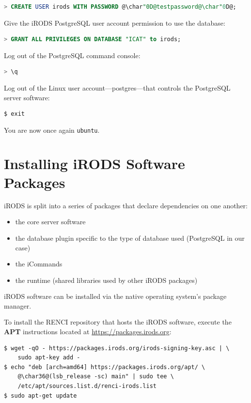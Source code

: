 \documentclass[10pt,oneside]{memoir}
\begin{document}
\begin{lstlisting}[language=sql]
  > CREATE USER irods WITH PASSWORD @\char"0D@testpassword@\char"0D@;
\end{lstlisting}

Give the iRODS PostgreSQL user account permission to use the database:

\begin{lstlisting}[language=sql]
> GRANT ALL PRIVILEGES ON DATABASE "ICAT" to irods;
\end{lstlisting}

Log out of the PostgreSQL command console:

\begin{lstlisting}[language=sql]
> \q
\end{lstlisting}

Log out of the Linux user account---postgres---that controls the PostgreSQL server software:

\begin{lstlisting}
$ exit
\end{lstlisting}

You are now once again \texttt{ubuntu}.

\section{Installing iRODS Software Packages}
iRODS is split into a series of packages that declare dependencies on one another:
\begin{itemize}
 \item the core server software
 \item the database plugin specific to the type of database used (PostgreSQL in our case)
 \item the iCommands
 \item the runtime (shared libraries used by other iRODS packages)
\end{itemize}

iRODS software can be installed via the native operating system's package manager.

To install the RENCI repository that hosts the iRODS software, execute the \textbf{APT} instructions located at \url{https://packages.irods.org}:

\begin{lstlisting}
$ wget -qO - https://packages.irods.org/irods-signing-key.asc | \
	sudo apt-key add -
$ echo "deb [arch=amd64] https://packages.irods.org/apt/ \
	@\char36@(lsb_release -sc) main" | sudo tee \
	/etc/apt/sources.list.d/renci-irods.list
$ sudo apt-get update
\end{lstlisting}
\end{document}
